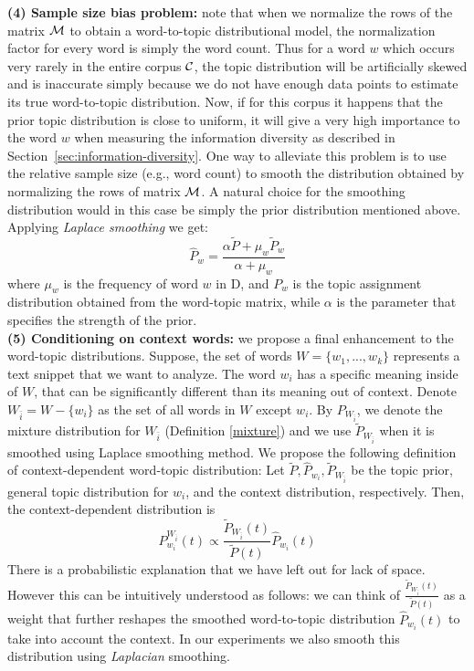 \documentclass{article} %
\begin{document}
{\bf (4) Sample size bias problem:}  note that 
when we normalize the rows of the matrix ${\mathcal M}$ to obtain a word-to-topic distributional model, the normalization factor 
for every word is simply the word count. Thus for a word $w$ which occurs very rarely
in the entire corpus ${\mathcal C}$, the topic distribution will be artificially skewed and is inaccurate simply because we do not have enough data points to estimate its true word-to-topic distribution.
Now, if for this corpus it happens that the prior topic distribution
is close to uniform, it will give a very high importance to the word
$w$ when measuring the information diversity as described in
Section~\ref{sec:information-diversity}.
One way to alleviate this
problem is to use the relative sample size (e.g., word count) to
smooth the distribution obtained by normalizing the rows of matrix
${\mathcal M}$. A natural choice for the smoothing distribution would in this
case be simply the prior distribution mentioned above. Applying {\em Laplace smoothing}
we get:
\begin{equation}
\widehat{P}_w=\frac{\alpha \tilde{P}+ \mu_w \tilde{P}_w}{\alpha+\mu_w}
\end{equation}
where $\mu_w$ is the frequency of word $w$ in D, and $P_w$ is the
topic assignment distribution obtained from the word-topic matrix,
while $\alpha$ is the parameter that specifies the strength of the
prior.\\
{\bf (5) Conditioning on context words:} we propose a final enhancement to the word-topic
distributions. Suppose, the set of words $W=\{w_1,...,w_k\}$
represents a text snippet that we want to analyze. The word $w_i$ has
a specific meaning inside of $W$, that can be significantly different
than its meaning out of context. Denote
$W_{\bar{i}}=W-\{w_i\}$ as the set of all words in $W$ except
$w_i$. By $P_{W_{\bar{i}}}$, we denote the mixture distribution for $W_{\bar{i}}$ (Definition \ref{mixture}) and we use $\tilde{P}_{W_{\bar{i}}}$ when it is smoothed using Laplace smoothing method. We
propose the following definition of context-dependent word-topic
distribution:
\bed
Let $\tilde{P},\widehat{P}_{w_i}, \tilde{P}_{W_{\bar{i}}}$ be the topic prior, general
topic distribution for $w_i$, and the context distribution,
respectively. Then, the context-dependent distribution is
\begin{equation*}
P^{W_{\bar{i}}}_{w_i}(t)\propto \frac{\tilde{P}_{W_{\bar{i}}}(t)}{\tilde{P}(t)}\widehat{P}_{w_i}(t)
\end{equation*}
\eed
There is a probabilistic explanation that we have left out for 
lack of space. However this can be intuitively understood as follows:
we can think of $\frac{\tilde{P}_{W_{\bar{i}}}(t)}{\tilde{P}(t)}$ as a weight
that further reshapes the smoothed word-to-topic distribution $\widehat{P}_{w_i}(t)$
to take into account the context. In our experiments we also smooth this distribution
using {\em Laplacian} smoothing.
\end{document}
